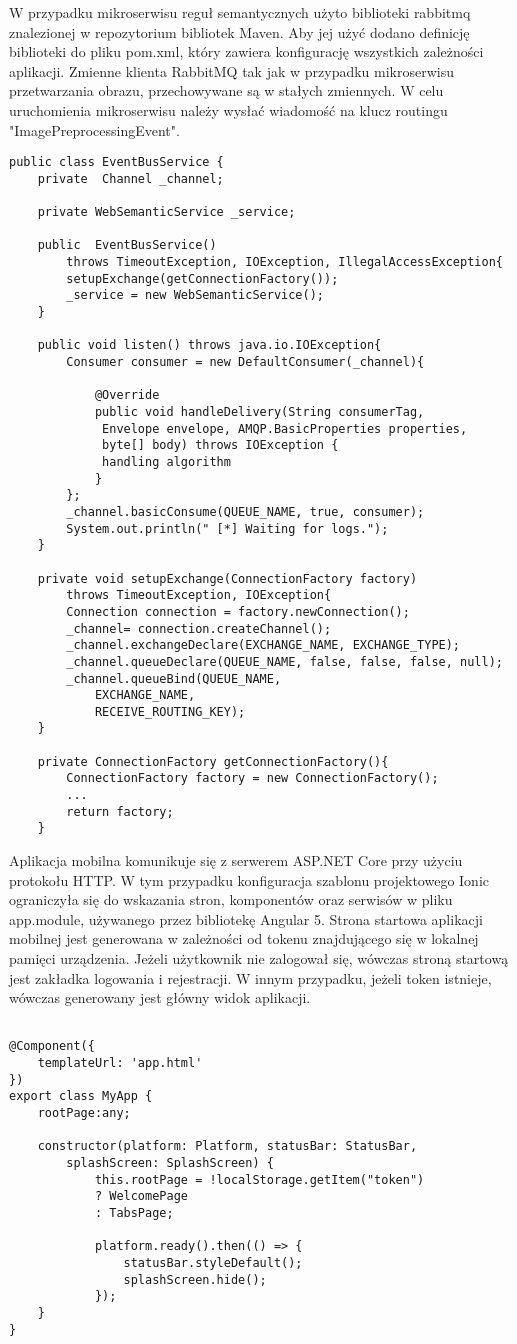 W przypadku mikroserwisu reguł semantycznych użyto biblioteki rabbitmq znalezionej w repozytorium bibliotek Maven. Aby jej użyć dodano definicję biblioteki do pliku pom.xml, który zawiera konfigurację wszystkich zależności aplikacji. Zmienne klienta RabbitMQ tak jak w przypadku mikroserwisu przetwarzania obrazu, przechowywane są w stałych zmiennych. W celu uruchomienia mikroserwisu należy wysłać wiadomość na klucz routingu "ImagePreprocessingEvent".
\begin{lstlisting}[caption={Klient RabbitMQ dla mikroserwisu reguł semantycznych.}]
public class EventBusService {
	private  Channel _channel;
	
	private WebSemanticService _service;
	
	public  EventBusService() 
		throws TimeoutException, IOException, IllegalAccessException{
		setupExchange(getConnectionFactory());
		_service = new WebSemanticService();
	}
	
	public void listen() throws java.io.IOException{
		Consumer consumer = new DefaultConsumer(_channel){
			
			@Override
			public void handleDelivery(String consumerTag,
			 Envelope envelope, AMQP.BasicProperties properties, 
			 byte[] body) throws IOException {
			 handling algorithm
			}
		};
		_channel.basicConsume(QUEUE_NAME, true, consumer);
		System.out.println(" [*] Waiting for logs.");
	}
	
	private void setupExchange(ConnectionFactory factory) 
		throws TimeoutException, IOException{
		Connection connection = factory.newConnection();
		_channel= connection.createChannel();
		_channel.exchangeDeclare(EXCHANGE_NAME, EXCHANGE_TYPE);
		_channel.queueDeclare(QUEUE_NAME, false, false, false, null);
		_channel.queueBind(QUEUE_NAME, 
			EXCHANGE_NAME, 
			RECEIVE_ROUTING_KEY);
	}
	
	private ConnectionFactory getConnectionFactory(){
		ConnectionFactory factory = new ConnectionFactory();
		...
		return factory;
	}
\end{lstlisting}
Aplikacja mobilna komunikuje się z serwerem ASP.NET Core przy użyciu protokołu HTTP. W tym przypadku konfiguracja szablonu projektowego Ionic ograniczyła się do wskazania stron, komponentów oraz serwisów w pliku app.module, używanego przez bibliotekę Angular 5. Strona startowa aplikacji mobilnej jest generowana w zależności od tokenu znajdującego się w lokalnej pamięci urządzenia. Jeżeli użytkownik nie zalogował się, wówczas stroną startową jest zakładka logowania i rejestracji. W innym przypadku, jeżeli token istnieje, wówczas generowany jest główny widok aplikacji.
\begin{lstlisting}[caption={Generowanie strony w zależności od tokenu znajdującego sie w pamięci urządzenia.}]

@Component({
	templateUrl: 'app.html'
})
export class MyApp {
	rootPage:any;
	
	constructor(platform: Platform, statusBar: StatusBar, 
		splashScreen: SplashScreen) {
			this.rootPage = !localStorage.getItem("token")
			? WelcomePage
			: TabsPage;
			
			platform.ready().then(() => {
				statusBar.styleDefault();
				splashScreen.hide();
			});
	}
}
\end{lstlisting}


